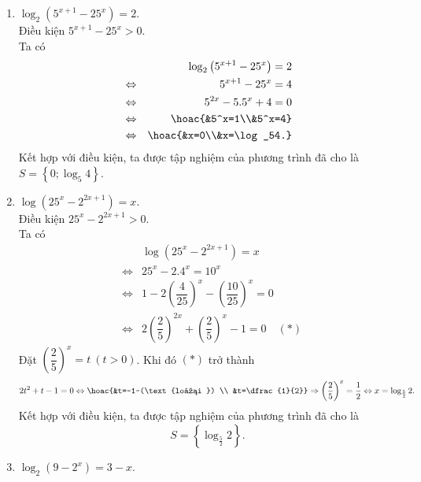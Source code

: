\begin{bt}
{\begin{enumerate}
\begin{eqnarray*}
				 &\Leftrightarrow& x^2-2x+64=25-10x+x^2
				\\ 
				 &\Leftrightarrow& 8x=-39
				 \\
				&\Leftrightarrow& x=-\dfrac{39}{8}. 
			\end{eqnarray*}
			Kết hợp với điều kiện, ta được tập nghiệm của phương trình đã cho  là $S=\left\{-\dfrac{39}{8}\right\}$.
			 \item $\log_2\left(5^{x+1}-25^x\right)=2$.\\
			Điều kiện  $5^{x+1}-25^x > 0$.\\
			 Ta có
			\allowdisplaybreaks 
			\begin{eqnarray*}
				&&\log_2\left(5^{x+1}-25^x\right)=2 
				 \\
				&\Leftrightarrow& 5^{x+1}-25^x=4 
				\\ 
				 &\Leftrightarrow& 5^{2x}-5.5^x+4=0
				 \\
				 &\Leftrightarrow&\hoac{&5^x=1\\&5^x=4}
				 \\
				 &\Leftrightarrow&\hoac{&x=0\\&x=\log_54.}
			\end{eqnarray*}
			Kết hợp  với điều kiện, ta được tập nghiệm của phương trình đã cho là $S=\left\{0; \log_5 4\right\}$.
			\item $\log  \left(25^x-2^{2x+1}\right)=x$.\\
			Điều kiện $25^x-2^{2x+1} > 0$.\\ 
			Ta có 
			 \allowdisplaybreaks
			\begin{eqnarray*}
				 &&\log \left(25^x-2^{2x+1}\right)=x
				 \\
				&\Leftrightarrow& 25^x-2.4^x=10^x 
				 \\
				 & \Leftrightarrow& 1-2\left(\dfrac{4}{25}\right)^x-\left(\dfrac{10}{25}\right)^x=0
				\\ 
				&\Leftrightarrow& 2\left(\dfrac{2}{5}\right)^{2x}+\left(\dfrac{2}{5}\right)^x-1=0\quad(*) 
			\end{eqnarray*}
			Đặt $\left(\dfrac{2}{5}\right)^x=t~(t >  0)$. Khi đó $(*)$ trở thành \[2t^2+t-1=0\Leftrightarrow\hoac{&t=-1~(\text{loại }) \\
			&t=\dfrac{1}{2}} \Rightarrow\left(\dfrac{2}{5}\right)^x=\dfrac{1}{2} \Leftrightarrow  x=\log _{\frac{5}{2}} 2.\]
			Kết hợp với điều kiện, ta được tập nghiệm  của phương trình đã cho là \[S=\left\{\log _{\frac{5}{2}} 2\right\}.\]
			 \item $\log_2\left(9-2^x\right)=3-x$.\\

\end{enumerate}}
\end{bt}
